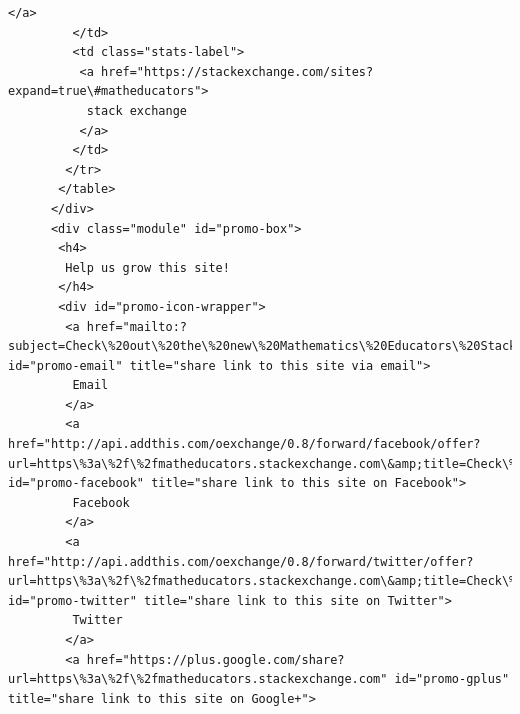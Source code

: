 \documentclass[11pt]{article}
\begin{document}
\begin{Verbatim}[commandchars=\\\{\}]
          </a>
         </td>
         <td class="stats-label">
          <a href="https://stackexchange.com/sites?expand=true\#matheducators">
           stack exchange
          </a>
         </td>
        </tr>
       </table>
      </div>
      <div class="module" id="promo-box">
       <h4>
        Help us grow this site!
       </h4>
       <div id="promo-icon-wrapper">
        <a href="mailto:?subject=Check\%20out\%20the\%20new\%20Mathematics\%20Educators\%20Stack\%20Exchange\%20Q\%26A\%20site\%20from\%20Stack\%20Exchange\&amp;body=Hi!\%0d\%0a\%0d\%0aI\%27m\%20supporting\%20a\%20new\%20Q\%26A\%20website\%20for\%20those\%20involved\%20in\%20the\%20field\%20of\%20teaching\%20mathematics.\%0d\%0a\%0d\%0aIt\%27s\%20built\%20on\%20the\%20same\%20software\%20as\%20stackoverflow.com\%2c\%20a\%20hugely\%20popular\%20site\%20where\%20over\%20seven\%20million\%20programmers\%20help\%20each\%20other\%20with\%20difficult\%20programming\%20problems.\%20On\%20Stack\%20Overflow\%20the\%20audience\%20votes\%20for\%20the\%20best\%20answer\%2c\%20so\%20the\%20answer\%20you\%20want\%20is\%20usually\%20right\%20at\%20the\%20top\%2c\%20not\%20on\%20page\%20five.\%0d\%0a\%0d\%0aI\%27m\%20hoping\%20that\%20a\%20site\%20for\%20those\%20involved\%20in\%20the\%20field\%20of\%20teaching\%20mathematics\%20would\%20have\%20the\%20same\%20kind\%20of\%20network\%20effect\%20and\%20turn\%20into\%20an\%20amazing\%20resource.\%0d\%0a\%0d\%0aThe\%20public\%20beta\%20is\%20going\%20on\%20here\%2c\%20if\%20you\%27re\%20interested\%20in\%20participating\%3a\%0d\%0a\%0d\%0ahttps\%3a\%2f\%2fmatheducators.stackexchange.com\%0d\%0a\%0d\%0aThanks!" id="promo-email" title="share link to this site via email">
         Email
        </a>
        <a href="http://api.addthis.com/oexchange/0.8/forward/facebook/offer?url=https\%3a\%2f\%2fmatheducators.stackexchange.com\&amp;title=Check\%20out\%20the\%20new\%20Mathematics\%20Educators\%20Stack\%20Exchange\%20Q\%26A\%20site\%20from\%20Stack\%20Exchange\&amp;username=stackoverflow" id="promo-facebook" title="share link to this site on Facebook">
         Facebook
        </a>
        <a href="http://api.addthis.com/oexchange/0.8/forward/twitter/offer?url=https\%3a\%2f\%2fmatheducators.stackexchange.com\&amp;title=Check\%20out\%20the\%20new\%20Mathematics\%20Educators\%20Stack\%20Exchange\%20QnA\%20site\%20from\%20\%40StackExchange\&amp;username=stackoverflow\&amp;template=\%7B\%7Btitle\%7D\%7D\%20\%7B\%7Burl\%7D\%7D" id="promo-twitter" title="share link to this site on Twitter">
         Twitter
        </a>
        <a href="https://plus.google.com/share?url=https\%3a\%2f\%2fmatheducators.stackexchange.com" id="promo-gplus" title="share link to this site on Google+">

\end{Verbatim}
\end{document}
